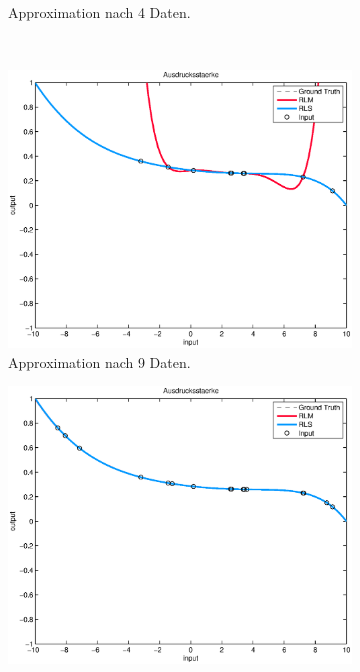 \documentclass[a4paper, 12pt]{article}
\begin{document}
{\begin{figure}[H]
\begin{subfigure}[b]{0.4\textwidth}
    \caption{Approximation nach 4 Daten.}
    \label{fig:perf:ausdruck:ausdruck4}
  \end{subfigure}
  \\
  \begin{subfigure}[b]{0.4\textwidth}
    \centering
    \includegraphics[width=\textwidth]{./images/copyofstats/ausdruck6_approx_piece_9.eps}
    \caption{Approximation nach 9 Daten.}
    \label{fig:perf:ausdruck:ausdruck9}
  \end{subfigure}
  \begin{subfigure}[b]{0.4\textwidth}
    \centering
    \includegraphics[width=\textwidth]{./images/copyofstats/ausdruck6_approx_piece_16.eps}

\end{subfigure}
\end{figure}}
\end{document}
